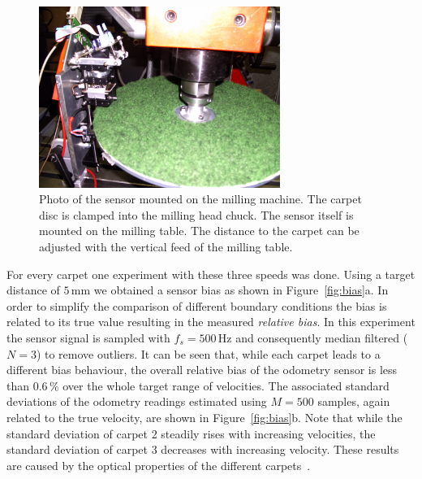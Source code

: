 \documentclass[12pt,a4paper]{article}
\begin{document}
\begin{figure}[htbp]
\begin{center}
\includegraphics[width=0.7\textwidth]{figures/pict0018.jpg}
\caption{\label{fig:pict0018}
Photo of the sensor mounted on the milling machine.
The carpet disc is clamped into the milling head chuck.
The sensor itself is mounted on the milling table.
The distance to the carpet can be adjusted with the vertical feed of the milling table.
}
\end{center}
\end{figure}

For every carpet one experiment with these three speeds was done. 
Using a target distance of $5\,$mm we obtained a sensor bias as shown in Figure~\ref{fig:bias}a. 
In order to simplify the comparison of different boundary conditions the bias is related to its true value resulting in the measured {\sl relative bias}. 
In this experiment the sensor signal is sampled with $f_s=500\,$Hz and consequently median filtered ($N=3$) to remove outliers.
It can be seen that, while each carpet leads to a different bias behaviour, the overall relative bias of the odometry sensor is less than $0.6\,\%$ over the whole target range of velocities. 
The associated standard deviations of the odometry readings estimated using $M=500$ samples, again related to the true velocity, are shown in Figure~\ref{fig:bias}b. 
Note that while the standard deviation of carpet 2 steadily rises with increasing velocities, the standard deviation
of carpet 3 decreases with increasing velocity. These results are caused by the optical properties of the different carpets~\cite{i2mtc}.
\end{document}
